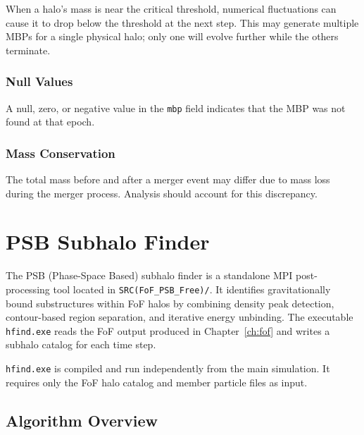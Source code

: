 \documentclass[11pt,fleqn]{book}
\newcommand{\code}[1]{\texttt{#1}}
\newcommand{\file}[1]{\texttt{#1}}
\begin{document}
When a halo's mass is near the critical threshold, numerical fluctuations can cause it to drop below the threshold at the next step.  This may generate multiple MBPs for a single physical halo; only one will evolve further while the others terminate.

\subsection{Null Values}

A null, zero, or negative value in the \code{mbp} field indicates that the MBP was not found at that epoch.

\subsection{Mass Conservation}

The total mass before and after a merger event may differ due to mass loss during the merger process.  Analysis should account for this discrepancy.


\chapter{PSB Subhalo Finder}
\label{ch:psb}

The PSB (Phase-Space Based) subhalo finder is a standalone MPI post-processing tool located in \file{SRC(FoF\_PSB\_Free)/}.  It identifies gravitationally bound substructures within FoF halos by combining density peak detection, contour-based region separation, and iterative energy unbinding.  The executable \code{hfind.exe} reads the FoF output produced in Chapter~\ref{ch:fof} and writes a subhalo catalog for each time step.

\begin{remark}
\code{hfind.exe} is compiled and run independently from the main simulation.  It requires only the FoF halo catalog and member particle files as input.
\end{remark}

\section{Algorithm Overview}
\end{document}
